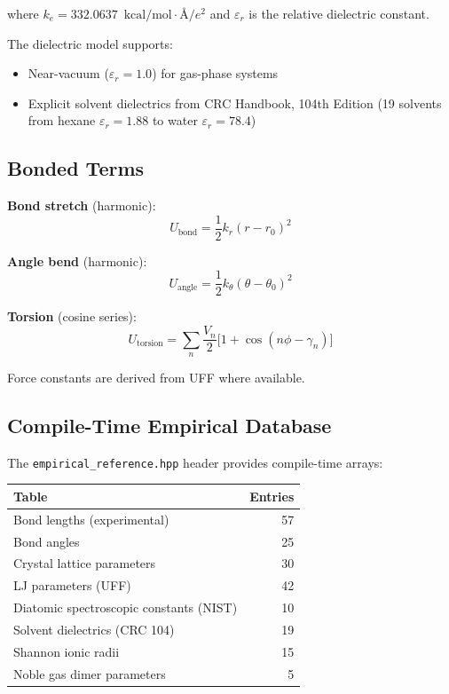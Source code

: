 \documentclass[11pt,twoside]{article}
\newcommand{\Angstrom}{\text{\AA}}
\newcommand{\kcalmol}{\text{kcal/mol}}
\begin{document}
where $k_e = 332.0637$~$\kcalmol \cdot \Angstrom / e^2$ and $\varepsilon_r$
is the relative dielectric constant.

The dielectric model supports:
\begin{itemize}
  \item Near-vacuum ($\varepsilon_r = 1.0$) for gas-phase systems
  \item Explicit solvent dielectrics from CRC Handbook, 104th Edition
        (19 solvents from hexane $\varepsilon_r = 1.88$ to water
        $\varepsilon_r = 78.4$)
\end{itemize}

\subsection{Bonded Terms}

\textbf{Bond stretch} (harmonic):
\begin{equation}
  U_{\mathrm{bond}} = \frac{1}{2} k_r (r - r_0)^2
\end{equation}

\textbf{Angle bend} (harmonic):
\begin{equation}
  U_{\mathrm{angle}} = \frac{1}{2} k_\theta (\theta - \theta_0)^2
\end{equation}

\textbf{Torsion} (cosine series):
\begin{equation}
  U_{\mathrm{torsion}} = \sum_n \frac{V_n}{2} \bigl[1 + \cos(n\phi - \gamma_n)\bigr]
\end{equation}

Force constants are derived from UFF where available.

\subsection{Compile-Time Empirical Database}

The \texttt{empirical\_reference.hpp} header provides compile-time arrays:

\begin{center}
\begin{tabular}{lr}
\toprule
\textbf{Table} & \textbf{Entries} \\
\midrule
Bond lengths (experimental) & 57 \\
Bond angles & 25 \\
Crystal lattice parameters & 30 \\
LJ parameters (UFF) & 42 \\
Diatomic spectroscopic constants (NIST) & 10 \\
Solvent dielectrics (CRC 104) & 19 \\
Shannon ionic radii & 15 \\
Noble gas dimer parameters & 5 \\
\bottomrule
\end{tabular}
\end{center}
\end{document}
